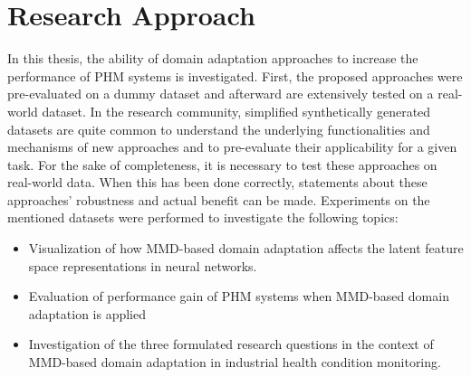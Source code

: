\section{Research Approach}
In this thesis, the ability of domain adaptation approaches to increase the performance of PHM systems is investigated. First, the proposed approaches were pre-evaluated on a dummy dataset and afterward are extensively tested on a real-world dataset. In the research community, simplified synthetically generated datasets are quite common to understand the underlying functionalities and mechanisms of new approaches and to pre-evaluate their applicability for a given task. For the sake of completeness, it is necessary to test these approaches on real-world data. When this has been done correctly, statements about these approaches' robustness and actual benefit can be made. Experiments on the mentioned datasets were performed to investigate the following topics:
\begin{itemize}
    \item  Visualization of how MMD-based domain adaptation affects the latent feature space representations in neural networks.
    \item Evaluation of performance gain of PHM systems when MMD-based domain adaptation is applied
    \item Investigation of the three formulated research questions in the context of MMD-based domain adaptation in industrial health condition monitoring.
\end{itemize}

